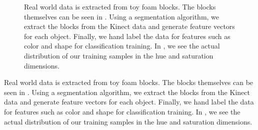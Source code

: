 \documentclass[11pt]{article}
\begin{document}
\begin{figure}[h!]
\centering
{}
\caption{Real world data is extracted from toy foam blocks. The blocks
    themselves can be seen in . Using a segmentation
    algorithm, we extract the blocks from the Kinect data 
    and generate feature vectors for each object.
    Finally, we hand label the data for features such as color and shape for
    classification training. In , we see the actual
    distribution of our training samples in the hue and saturation
    dimensions.}
\label{fig:objects}
\end{figure}


Real world data is extracted from toy foam blocks. The blocks
    themselves can be seen in . Using a segmentation
    algorithm, we extract the blocks from the Kinect data 
    and generate feature vectors for each object.
    Finally, we hand label the data for features such as color and shape for
    classification training. In , we see the actual
    distribution of our training samples in the hue and saturation
    dimensions.
\end{document}
